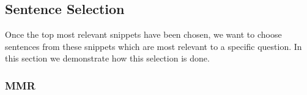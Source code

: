 \documentclass[11pt,a4paper]{article}
\begin{document}




\subsection{Sentence Selection}
Once the top most relevant snippets have been chosen, we want to choose sentences from these snippets which are most relevant to a specific question. In this section we demonstrate how this selection is done.

\subsubsection{MMR}
\end{document}
